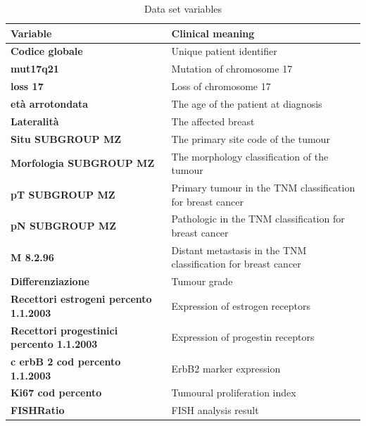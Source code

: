 \begin{table}[htbp]
\caption{Data set variables}
\begin{tabularx}{\textwidth}{@{} l Y @{}}
\toprule 
\textbf{Variable} & Clinical meaning \\
\midrule 
\textbf{Codice globale} & Unique patient identifier \\
\textbf{mut17q21} & Mutation of chromosome 17 \\
\textbf{loss 17} & Loss of chromosome 17 \\
\textbf{et\`a arrotondata} & The age of the patient at diagnosis \\
\textbf{Lateralit\`a} & The affected breast \\
\textbf{Situ SUBGROUP MZ} & The primary site code of the tumour \\
\textbf{Morfologia SUBGROUP MZ} & The morphology classification of the tumour \\
\textbf{pT SUBGROUP MZ} & Primary tumour in the TNM classification for breast cancer \\
\textbf{pN SUBGROUP MZ} & Pathologic in the TNM classification for breast cancer \\
\textbf{M 8.2.96} & Distant metastasis in the TNM classification for breast cancer \\
\textbf{Differenziazione} & Tumour grade \\
\textbf{Recettori estrogeni percento 1.1.2003} & Expression of estrogen receptors \\
\textbf{Recettori progestinici percento 1.1.2003} & Expression of progestin receptors \\
\textbf{c erbB 2  cod percento 1.1.2003} & ErbB2 marker expression \\
\textbf{Ki67 cod percento} & Tumoural proliferation index \\
\textbf{FISHRatio} & FISH analysis result \\
\bottomrule
\end{tabularx}
\label{tab:datasetvariables}
\end{table}

